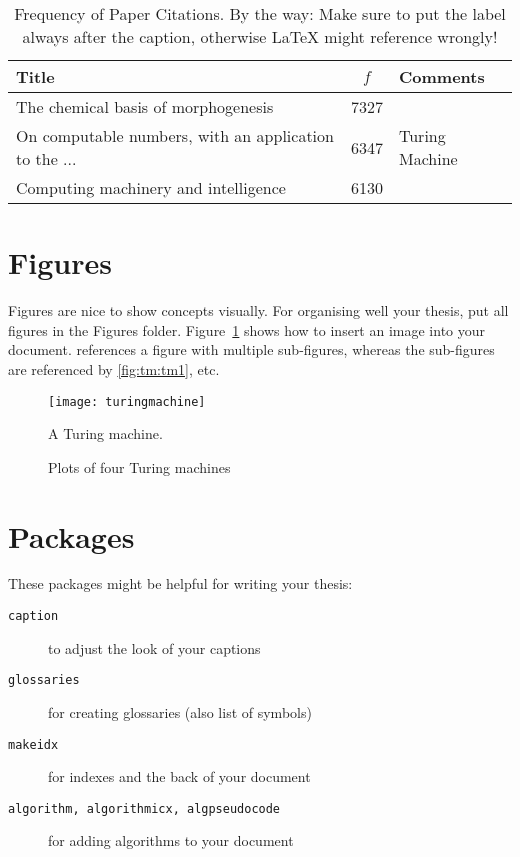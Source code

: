 \begin{table}[ht!]
	\centering
	\caption{Frequency of Paper Citations. By the way: Make sure to put the label always after the caption, otherwise \LaTeX{} might reference wrongly!}
	\begin{tabular}{lcl} \toprule
		Title                                                 & $f$  & Comments       \\ \midrule
		The chemical basis of morphogenesis                   & 7327 &                \\
		On computable numbers, with an application to the ... & 6347 & Turing Machine \\
		Computing machinery and intelligence                  & 6130 &                \\ \bottomrule
	\end{tabular}
	\label{tab:table}
\end{table}




\section{Figures}
Figures are nice to show concepts visually. For organising well your thesis, put all figures in the Figures folder. Figure~\ref{fig:machine} shows how to insert an image into your document.  references a figure with multiple sub-figures, whereas the sub-figures are referenced by \cref{fig:tm:tm1}, etc. 

\begin{figure}
	\centering
	\texttt{[image: turingmachine]}
	\caption{A Turing machine.}
	\label{fig:machine}
\end{figure}


\begin{figure}
	\centering
	\caption{Plots of four Turing machines}
	\label{fig:tm}
\end{figure}


\section{Packages}
These packages might be helpful for writing your thesis:

\begin{description}
	\item[\texttt{caption}] to adjust the look of your captions
	\item[\texttt{glossaries}] for creating glossaries (also list of symbols)
	\item[\texttt{makeidx}] for indexes and the back of your document
	\item[\texttt{algorithm, algorithmicx, algpseudocode}] for adding algorithms to your document
\end{description}
